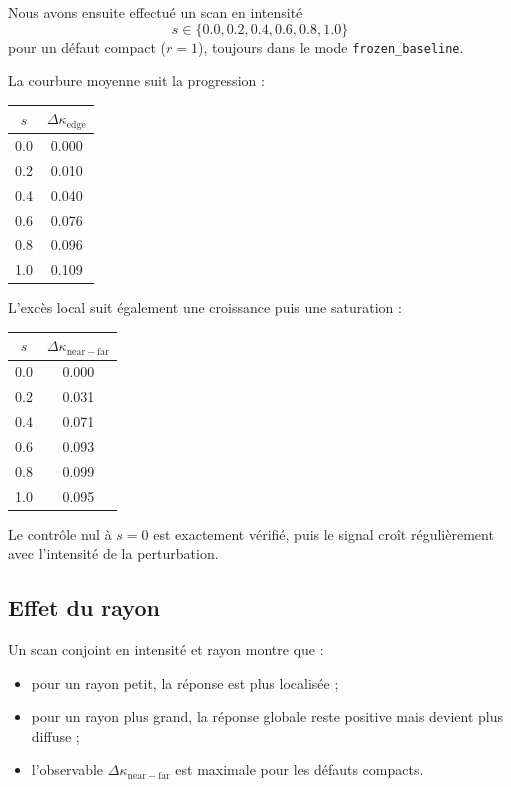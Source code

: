 \documentclass[11pt]{article}
\begin{document}
Nous avons ensuite effectué un scan en intensité
\[
s \in \{0.0,0.2,0.4,0.6,0.8,1.0\}
\]
pour un défaut compact ($r=1$), toujours dans le mode \texttt{frozen\_baseline}.

La courbure moyenne suit la progression :

\begin{center}
\begin{tabular}{cc}
\toprule
$s$ & $\Delta \kappa_{\mathrm{edge}}$ \\
\midrule
0.0 & 0.000 \\
0.2 & 0.010 \\
0.4 & 0.040 \\
0.6 & 0.076 \\
0.8 & 0.096 \\
1.0 & 0.109 \\
\bottomrule
\end{tabular}
\end{center}

L'excès local suit également une croissance puis une saturation :

\begin{center}
\begin{tabular}{cc}
\toprule
$s$ & $\Delta \kappa_{\mathrm{near-far}}$ \\
\midrule
0.0 & 0.000 \\
0.2 & 0.031 \\
0.4 & 0.071 \\
0.6 & 0.093 \\
0.8 & 0.099 \\
1.0 & 0.095 \\
\bottomrule
\end{tabular}
\end{center}

Le contrôle nul à $s=0$ est exactement vérifié, puis le signal croît régulièrement avec l'intensité de la perturbation.

\subsection{Effet du rayon}

Un scan conjoint en intensité et rayon montre que :

\begin{itemize}
\item pour un rayon petit, la réponse est plus localisée ;
\item pour un rayon plus grand, la réponse globale reste positive mais devient plus diffuse ;
\item l'observable $\Delta \kappa_{\mathrm{near-far}}$ est maximale pour les défauts compacts.
\end{itemize}
\end{document}
